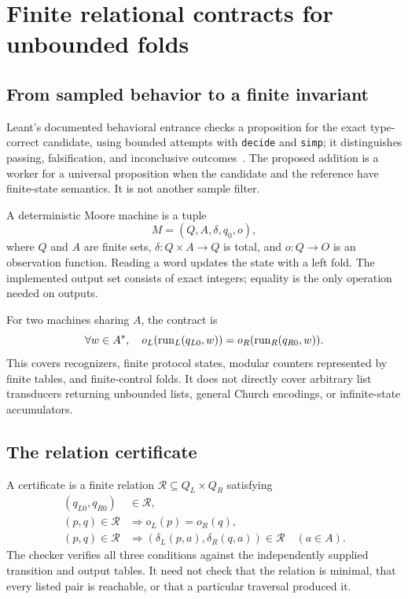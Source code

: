\section{Finite relational contracts for unbounded folds}
\label{sec:machines}

\subsection{From sampled behavior to a finite invariant}

Leant's documented behavioral entrance checks a proposition for the exact type-correct candidate, using bounded attempts with \texttt{decide} and \texttt{simp}; it distinguishes passing, falsification, and inconclusive outcomes~\cite{leant-behavior}. The proposed addition is a worker for a universal proposition when the candidate and the reference have finite-state semantics. It is not another sample filter.

A deterministic Moore machine is a tuple
\[
 M=(Q,A,\delta,q_0,o),
\]
where $Q$ and $A$ are finite sets, $\delta:Q\times A\to Q$ is total, and $o:Q\to O$ is an observation function. Reading a word updates the state with a left fold. The implemented output set consists of exact integers; equality is the only operation needed on outputs.

For two machines sharing $A$, the contract is
\begin{equation}
 \forall w\in A^*,\quad
 o_L(\operatorname{run}_L(q_{L0},w))=o_R(\operatorname{run}_R(q_{R0},w)).
 \label{eq:machine-contract}
\end{equation}
This covers recognizers, finite protocol states, modular counters represented by finite tables, and finite-control folds. It does not directly cover arbitrary list transducers returning unbounded lists, general Church encodings, or infinite-state accumulators.

\subsection{The relation certificate}

A certificate is a finite relation $\mathcal R\subseteq Q_L\times Q_R$ satisfying
\begin{align}
 (q_{L0},q_{R0})&\in\mathcal R,\label{eq:machine-root}\\
 (p,q)\in\mathcal R&\Longrightarrow o_L(p)=o_R(q),\label{eq:machine-out}\\
 (p,q)\in\mathcal R&\Longrightarrow
   (\delta_L(p,a),\delta_R(q,a))\in\mathcal R\quad(a\in A).
 \label{eq:machine-step}
\end{align}
The checker verifies all three conditions against the independently supplied transition and output tables. It need not check that the relation is minimal, that every listed pair is reachable, or that a particular traversal produced it.

